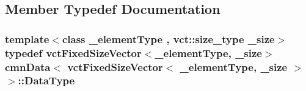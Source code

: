 \subsection{Member Typedef Documentation}
\hypertarget{classcmn_data_3_01vct_fixed_size_vector_3_01__element_type_00_01__size_01_4_01_4_ac8ff1c45828cc2add8111e02980f183a}{
\subsubsection[{Data\-Type}]{\setlength{\rightskip}{0pt plus 5cm}template$<$class \-\_\-element\-Type , vct\-::size\-\_\-type \-\_\-size$>$ typedef {\bf vct\-Fixed\-Size\-Vector}$<$\-\_\-element\-Type, \-\_\-size$>$ {\bf cmn\-Data}$<$ {\bf vct\-Fixed\-Size\-Vector}$<$ \-\_\-element\-Type, \-\_\-size $>$ $>$\-::{\bf Data\-Type}}}\label{classcmn_data_3_01vct_fixed_size_vector_3_01__element_type_00_01__size_01_4_01_4_ac8ff1c45828cc2add8111e02980f183a}


